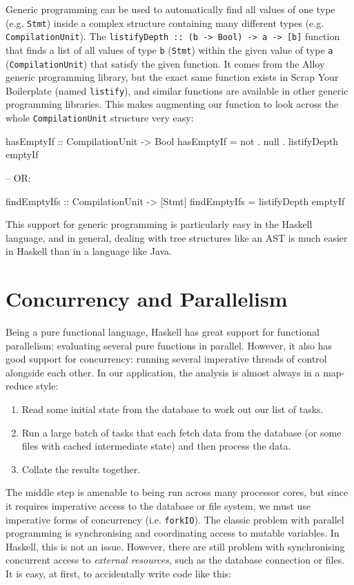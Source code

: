 \documentclass{tmr}
\begin{document}
Generic programming can be used to automatically find all values of one type (e.g. \lstinline|Stmt|) inside a complex structure containing many different types (e.g. \lstinline|CompilationUnit|).  The \lstinline|listifyDepth :: (b -> Bool) -> a -> [b]| function that finds a list of all values of type \lstinline|b| (\lstinline|Stmt|) within the given value of type \lstinline|a| (\lstinline|CompilationUnit|) that satisfy the given function.  It comes from the Alloy generic programming library, but the exact same function exists in Scrap Your Boilerplate (named \lstinline|listify|), and similar functions are available in other generic programming libraries.  This makes augmenting our function to look across the whole \lstinline|CompilationUnit| structure very easy:

\begin{code}
hasEmptyIf :: CompilationUnit -> Bool
hasEmptyIf = not . null . listifyDepth emptyIf

-- OR:

findEmptyIfs :: CompilationUnit -> [Stmt]
findEmptyIfs = listifyDepth emptyIf
\end{code}

This support for generic programming is particularly easy in the Haskell language, and in general, dealing with tree structures like an AST is much easier in Haskell than in a language like Java.

\section{Concurrency and Parallelism}

Being a pure functional language, Haskell has great support for functional parallelism: evaluating several pure functions in parallel.  However, it also has good support for concurrency: running several imperative threads of control alongside each other.  In our application, the analysis is almost always in a map-reduce style:

\begin{enumerate}
\item Read some initial state from the database to work out our list of tasks.
\item Run a large batch of tasks that each fetch data from the database (or some files with cached intermediate state) and then process the data.
\item Collate the results together.
\end{enumerate}

The middle step is amenable to being run across many processor cores, but since it requires imperative access to the database or file system, we must use imperative forms of concurrency (i.e. \lstinline|forkIO|).  The classic problem with parallel programming is synchronising and coordinating access to mutable variables.  In Haskell, this is not an issue.  However, there are still problem with synchronising concurrent access to \textit{external resources}, such as the database connection or files.  It is easy, at first, to accidentally write code like this:
\end{document}
